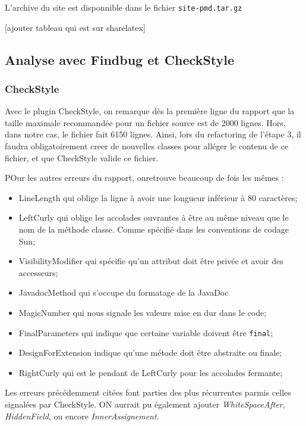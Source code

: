 		L'archive du site est disponnible dans le fichier \og \verb#site-pmd.tar.gz# \fg

		[ajouter tableau qui est sur sharelatex]



	\subsection{Analyse avec Findbug et CheckStyle}
		\subsubsection{CheckStyle}
			Avec le plugin CheckStyle, on remarque dès la première ligne du rapport que la taille maximale recommandée pour un fichier source est de 2000 lignes. Hors, dans notre cas, le fichier fait 6150 lignes. Ainsi, lors du refactoring de l'étape 3, il faudra obligatoirement creer de nouvelles classes pour alléger le contenu de ce fichier, et que CheckStyle valide ce fichier.

			POur les autres erreurs du rapport, onretrouve beaucoup de fois les mêmes :
			\begin{itemize}
				\item LineLength qui oblige la ligne à avoir une longueur inférieur à 80 caractères;
				\item LeftCurly qui oblige les accolades ouvrantes à être au même niveau que le nom de la méthode classe. Comme spécifié dans les conventions de codage Sun;
				\item VisibilityModifier qui spécifie qu'un attribut doit être privée et avoir des accesseurs;
				\item JavadocMethod qui s'occupe du formatage de la JavaDoc
				\item MagicNumber qui nous signale les valeurs mise en dur dans le code;
				\item FinalParameters qui indique que certaine variable doivent être \verb+final+;
				\item DesignForExtension indique qu'une métode doit être abstraite ou finale;
				\item RightCurly qui est le pendant de LeftCurly pour les accolades fermante;
			\end{itemize}

			Les erreurs précédemment citées font parties des plus récurrentes parmis celles signalées par CheckStyle. ON aurrait pu également ajouter \emph{WhiteSpaceAfter}, \emph{HiddenField}, ou encore \emph{InnerAssignement}.

